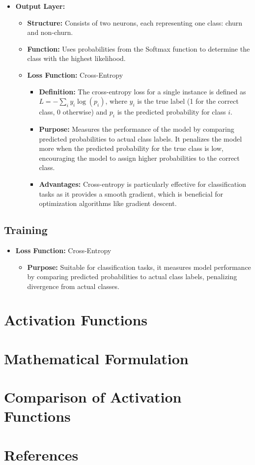 \documentclass[12pt,a4paper]{article}
\begin{document}
\begin{itemize}
    \item \textbf{Output Layer:}
    \begin{itemize}
        \item \textbf{Structure:} Consists of two neurons, each representing one class: churn and non-churn.
        \item \textbf{Function:} Uses probabilities from the Softmax function to determine the class with the highest likelihood.
        \item \textbf{Loss Function:} Cross-Entropy
        \begin{itemize}
            \item \textbf{Definition:} The cross-entropy loss for a single instance is defined as \( L = -\sum_{i} y_i \log(p_i) \), where \( y_i \) is the true label (1 for the correct class, 0 otherwise) and \( p_i \) is the predicted probability for class \( i \).
            \item \textbf{Purpose:} Measures the performance of the model by comparing predicted probabilities to actual class labels. It penalizes the model more when the predicted probability for the true class is low, encouraging the model to assign higher probabilities to the correct class.
            \item \textbf{Advantages:} Cross-entropy is particularly effective for classification tasks as it provides a smooth gradient, which is beneficial for optimization algorithms like gradient descent.
        \end{itemize}
    \end{itemize}
\end{itemize}

\subsection{Training}

\begin{itemize}
    \item \textbf{Loss Function:} Cross-Entropy
    \begin{itemize}
        \item \textbf{Purpose:} Suitable for classification tasks, it measures model performance by comparing predicted probabilities to actual class labels, penalizing divergence from actual classes.
    \end{itemize}
\end{itemize}

\section{Activation Functions}

\section{Mathematical Formulation}

\section{Comparison of Activation Functions}

\section{References}


\end{document}

